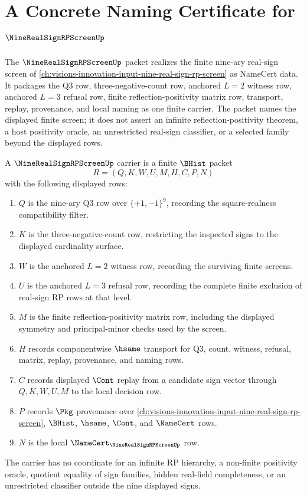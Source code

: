 \chapter{A Concrete Naming Certificate for $\NineRealSignRPScreenUp$}
\label{ch:concrete-instances-nine-real-sign-rp-screen-namecert}

The $\NineRealSignRPScreenUp$ packet realizes the finite nine-ary real-sign screen of \autoref{ch:visions-innovation-input-nine-real-sign-rp-screen} as NameCert data. It packages the Q3 row, three-negative-count row, anchored $L=2$ witness row, anchored $L=3$ refusal row, finite reflection-positivity matrix row, transport, replay, provenance, and local naming as one finite carrier. The packet names the displayed finite screen; it does not assert an infinite reflection-positivity theorem, a host positivity oracle, an unrestricted real-sign classifier, or a selected family beyond the displayed rows.

\begin{definition}
\label{def:nine-real-sign-rp-screen-carrier}
A $\NineRealSignRPScreenUp$ carrier is a finite $\BHist$ packet
$$
R=(Q,K,W,U,M,H,C,P,N)
$$
with the following displayed rows:
\begin{enumerate}
\item $Q$ is the nine-ary Q3 row over $\{+1,-1\}^9$, recording the square-realness compatibility filter.
\item $K$ is the three-negative-count row, restricting the inspected signs to the displayed cardinality surface.
\item $W$ is the anchored $L=2$ witness row, recording the surviving finite screens.
\item $U$ is the anchored $L=3$ refusal row, recording the complete finite exclusion of real-sign RP rows at that level.
\item $M$ is the finite reflection-positivity matrix row, including the displayed symmetry and principal-minor checks used by the screen.
\item $H$ records componentwise $\hsame$ transport for Q3, count, witness, refusal, matrix, replay, provenance, and naming rows.
\item $C$ records displayed $\Cont$ replay from a candidate sign vector through $Q,K,W,U,M$ to the local decision row.
\item $P$ records $\Pkg$ provenance over \autoref{ch:visions-innovation-input-nine-real-sign-rp-screen}, $\BHist$, $\hsame$, $\Cont$, and $\NameCert$ rows.
\item $N$ is the local $\NameCert_{\NineRealSignRPScreenUp}$ row.
\end{enumerate}
The carrier has no coordinate for an infinite RP hierarchy, a non-finite positivity oracle, quotient equality of sign families, hidden real-field completeness, or an unrestricted classifier outside the nine displayed signs.
\end{definition}

